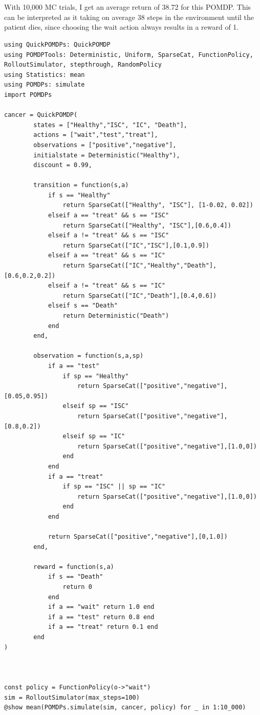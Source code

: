 \documentclass[11pt]{article}
\begin{document}
\section{}

With 10,000 MC trials, I get an average return of 38.72 for this POMDP. This can be interpreted as it taking on average 38 steps in the environment until the patient dies, since choosing the wait action always results in a reward of 1.

\begin{lstlisting}
using QuickPOMDPs: QuickPOMDP
using POMDPTools: Deterministic, Uniform, SparseCat, FunctionPolicy, RolloutSimulator, stepthrough, RandomPolicy
using Statistics: mean
using POMDPs: simulate
import POMDPs

cancer = QuickPOMDP(
        states = ["Healthy","ISC", "IC", "Death"],
        actions = ["wait","test","treat"],
        observations = ["positive","negative"],
        initialstate = Deterministic("Healthy"),
        discount = 0.99,

        transition = function(s,a)
            if s == "Healthy"
                return SparseCat(["Healthy", "ISC"], [1-0.02, 0.02])
            elseif a == "treat" && s == "ISC"
                return SparseCat(["Healthy", "ISC"],[0.6,0.4])
            elseif a != "treat" && s == "ISC"
                return SparseCat(["IC","ISC"],[0.1,0.9])
            elseif a == "treat" && s == "IC"
                return SparseCat(["IC","Healthy","Death"],[0.6,0.2,0.2])
            elseif a != "treat" && s == "IC"
                return SparseCat(["IC","Death"],[0.4,0.6])
            elseif s == "Death"
                return Deterministic("Death")
            end
        end,

        observation = function(s,a,sp)
            if a == "test"
                if sp == "Healthy"
                    return SparseCat(["positive","negative"],[0.05,0.95])
                elseif sp == "ISC"
                    return SparseCat(["positive","negative"],[0.8,0.2])
                elseif sp == "IC"
                    return SparseCat(["positive","negative"],[1.0,0])
                end
            end
            if a == "treat"
                if sp == "ISC" || sp == "IC"
                    return SparseCat(["positive","negative"],[1.0,0])
                end
            end

            return SparseCat(["positive","negative"],[0,1.0])
        end,

        reward = function(s,a)
            if s == "Death"
                return 0
            end
            if a == "wait" return 1.0 end
            if a == "test" return 0.8 end
            if a == "treat" return 0.1 end
        end
)



const policy = FunctionPolicy(o->"wait")
sim = RolloutSimulator(max_steps=100)
@show mean(POMDPs.simulate(sim, cancer, policy) for _ in 1:10_000)


\end{lstlisting}
\end{document}
